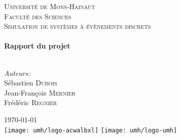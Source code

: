  \thispagestyle{empty}
\begin{center}
 
\textsc{\LARGE Université de Mons-Hainaut}\\[0.5cm]
\textsc{\Large Faculté des Sciences}\\[4.0cm]
\textsc{\Large Simulation de systèmes à évènements discrets}\\[0.5cm]
 
 
\HRule \\[0.4cm]
{ \Large \bfseries Rapport du projet}\\[0.3cm]
 
\HRule \\[1.5cm]
 
\begin{minipage}{0.4\textwidth}
\begin{flushleft} \large
\emph{Auteurs:} 
\\ Sébastien \textsc{Dubois}
\\ Jean-François \textsc{Mernier}
\\ Frédéric \textsc{Regnier}

\end{flushleft}
\end{minipage}
\begin{minipage}{0.4\textwidth}
\begin{flushright} \large
\end{flushright}
\end{minipage}


\vfill

{\Large \today}\\[1.5cm]

\texttt{[image: umh/logo-acwalbxl]}
\texttt{[image: umh/logo-umh]}

\end{center}


\newpage
\thispagestyle{empty}
\mbox{}
\newpage
